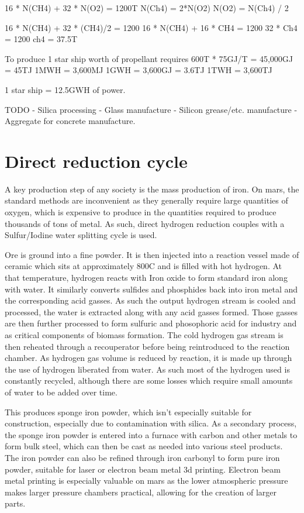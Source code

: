\documentclass[10pt]{article}
\begin{document}
16 * N(CH4) + 32 * N(O2) = 1200T
N(Ch4) = 2*N(O2)
N(O2) = N(Ch4) / 2

16 * N(CH4) + 32 * (CH4)/2 = 1200
16 * N(CH4) + 16 * CH4 = 1200
32 * Ch4 = 1200
ch4 = 37.5T

To produce 1 star ship worth of propellant requires 600T * 75GJ/T = 45,000GJ = 45TJ
1MWH = 3,600MJ
1GWH = 3,600GJ = 3.6TJ
1TWH = 3,600TJ

1 star ship = 12.5GWH of power.


TODO - Silica processing
- Glass manufacture
- Silicon grease/etc. manufacture
- Aggregate for concrete manufacture.


\section{Direct reduction cycle}
A key production step of any society is the mass production of iron. On mars, the standard methods are inconvenient as they generally require large quantities of oxygen, which is expensive to produce in the quantities required to produce thousands of tons of metal. As such, direct hydrogen reduction couples with a Sulfur/Iodine water splitting cycle is used.

Ore is ground into a fine powder. It is then injected into a reaction vessel made of ceramic which sits at approximately 800C and is filled with hot hydrogen. At that temperature, hydrogen reacts with Iron oxide to form standard iron along with water. It similarly converts sulfides and phosphides back into iron metal and the corresponding acid gasses. As such the output hydrogen stream is cooled and processed, the water is extracted along with any acid gasses formed. Those gasses are then further processed to form sulfuric and phosophoric acid for industry and as critical components of biomass formation. The cold hydrogen gas stream is then reheated through a recouperator before being reintroduced to the reaction chamber. As hydrogen gas volume is reduced by reaction, it is made up through the use of hydrogen liberated from water. As such most of the hydrogen used is constantly recycled, although there are some losses which require small amounts of water to be added over time.

This produces sponge iron powder, which isn't especially suitable for construction, especially due to contamination with silica. As a secondary process, the sponge iron powder is entered into a furnace with carbon and other metals to form bulk steel, which can then be cast as needed into various steel products. The iron powder can also be refined through iron carbonyl to form pure iron powder, suitable for laser or electron beam metal 3d printing. Electron beam metal printing is especially valuable on mars as the lower atmospheric pressure makes larger pressure chambers practical, allowing for the creation of larger parts.
\end{document}
